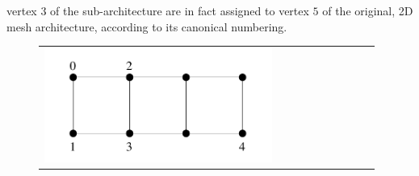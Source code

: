 \begin{itemize}
vertex $3$ of the sub-architecture are in fact assigned to vertex $5$
of the original, 2D mesh architecture, according to its canonical
numbering.
\begin{figure}[hbt]
\begin{tabular}{p{0.69\linewidth}@{}p{0.29\linewidth}}
\begin{center}
\parbox[t]{0.9\linewidth}{\vspace{0pt}\includegraphics[width=0.7\linewidth]{m42_a1}}
\end{center}
&
\begin{center}
{\renewcommand{\baselinestretch}{1.05}
\footnotesize\tt
\begin{verbatim}



\end{verbatim}}
\end{center}
\end{tabular}
\end{figure}
\end{itemize}
